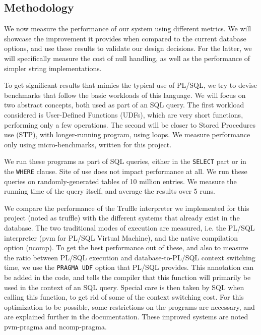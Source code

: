 \documentclass[twoside,11pt,a4paper]{article}
\newcommand{\sql}[1]{\texttt{#1}}
\newcommand{\pls}[1]{\small\texttt{#1}\normalsize}
\newcommand{\benchsystem}[1]{\textsf{#1}}
\newcommand{\pvm}{\benchsystem{pvm}}
\newcommand{\pvmg}{\benchsystem{pvm-pragma}}
\newcommand{\ncomp}{\benchsystem{ncomp}}
\newcommand{\ncpg}{\benchsystem{ncomp-pragma}}
\newcommand{\truffle}{\benchsystem{truffle}}
\begin{document}
\subsection{Methodology}


We now measure the performance of our system using different metrics. We will showcase the improvement it provides when compared to the current database options, and use these results to validate our design decisions. For the latter, we will specifically measure the cost of null handling, as well as the performance of simpler string implementations.

To get significant results that mimics the typical use of PL/SQL, we try to devise benchmarks that follow the basic workloads of this language. We will focus on two abstract concepts, both used as part of an SQL query. The first workload considered is User-Defined Functions (UDFs), which are very short functions, performing only a few operations. The second will be closer to Stored Procedures use (STP), with longer-running program, using loops. We measure performance only using micro-benchmarks, written for this project.

We run these programs as part of SQL queries, either in the \sql{SELECT} part or in the \sql{WHERE} clause. Site of use does not impact performance at all. We run these queries on randomly-generated tables of 10 million entries. We measure the running time of the query itself, and average the results over 5 runs.

We compare the performance of the Truffle interpreter we implemented for this project (noted as \truffle{}) with the different systems that already exist in the database. The two traditional modes of execution are measured, i.e. the PL/SQL interpreter (\pvm{} for PL/SQL Virtual Machine), and the native compilation option (\ncomp{}). To get the best performance out of these, and also to measure the ratio between PL/SQL execution and database-to-PL/SQL context switching time, we use the \pls{PRAGMA UDF} option that PL/SQL provides. This annotation can be added in the code, and tells the compiler that this function will primarily be used in the context of an SQL query. Special care is then taken by SQL when calling this function, to get rid of some of the context switching cost. For this optimization to be possible, some restrictions on the programs are necessary, and are explained further in the documentation. These improved systems are noted \pvmg{} and \ncpg{}.
\end{document}
